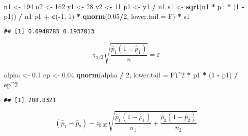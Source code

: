 \documentclass[
]{book}
\newenvironment{Shaded}{\begin{snugshade}}{\end{snugshade}}
\newcommand{\DataTypeTok}[1]{\textcolor[rgb]{0.13,0.29,0.53}{#1}}
\newcommand{\DecValTok}[1]{\textcolor[rgb]{0.00,0.00,0.81}{#1}}
\newcommand{\FloatTok}[1]{\textcolor[rgb]{0.00,0.00,0.81}{#1}}
\newcommand{\KeywordTok}[1]{\textcolor[rgb]{0.13,0.29,0.53}{\textbf{#1}}}
\newcommand{\NormalTok}[1]{#1}
\newcommand{\OperatorTok}[1]{\textcolor[rgb]{0.81,0.36,0.00}{\textbf{#1}}}
\newcommand{\StringTok}[1]{\textcolor[rgb]{0.31,0.60,0.02}{#1}}
\theoremstyle{definition}
\theoremstyle{definition}
\theoremstyle{definition}
\theoremstyle{remark}
\begin{document}
\begin{Shaded}
\begin{Highlighting}[]
\NormalTok{n1 <-}\StringTok{ }\DecValTok{194}
\NormalTok{n2 <-}\StringTok{ }\DecValTok{162}
\NormalTok{y1 <-}\StringTok{ }\DecValTok{28} 
\NormalTok{y2 <-}\StringTok{ }\DecValTok{11}
\NormalTok{p1 <-}\StringTok{ }\NormalTok{y1 }\OperatorTok{/}\StringTok{ }\NormalTok{n1}
\NormalTok{s1 <-}\StringTok{ }\KeywordTok{sqrt}\NormalTok{(n1 }\OperatorTok{*}\StringTok{ }\NormalTok{p1 }\OperatorTok{*}\StringTok{ }\NormalTok{(}\DecValTok{1} \OperatorTok{-}\StringTok{ }\NormalTok{p1)) }\OperatorTok{/}\StringTok{ }\NormalTok{n1}
\NormalTok{p1 }\OperatorTok{+}\StringTok{ }\KeywordTok{c}\NormalTok{(}\OperatorTok{-}\DecValTok{1}\NormalTok{, }\DecValTok{1}\NormalTok{) }\OperatorTok{*}\StringTok{ }\KeywordTok{qnorm}\NormalTok{(}\FloatTok{0.05}\OperatorTok{/}\DecValTok{2}\NormalTok{, }\DataTypeTok{lower.tail =}\NormalTok{ F) }\OperatorTok{*}\StringTok{ }\NormalTok{s1}
\end{Highlighting}
\end{Shaded}

\begin{verbatim}
## [1] 0.0948785 0.1937813
\end{verbatim}

\[
z_{\alpha / 2} \sqrt{\frac{\hat{p}_{1}\left(1-\hat{p}_{1}\right)}{n}} = \varepsilon
\]

\begin{Shaded}
\begin{Highlighting}[]
\NormalTok{alpha <-}\StringTok{ }\FloatTok{0.1}
\NormalTok{ep <-}\StringTok{ }\FloatTok{0.04}
\KeywordTok{qnorm}\NormalTok{(alpha }\OperatorTok{/}\StringTok{ }\DecValTok{2}\NormalTok{, }\DataTypeTok{lower.tail =}\NormalTok{ F)}\OperatorTok{^}\DecValTok{2} \OperatorTok{*}\StringTok{ }\NormalTok{p1 }\OperatorTok{*}\StringTok{ }\NormalTok{(}\DecValTok{1} \OperatorTok{-}\StringTok{ }\NormalTok{p1) }\OperatorTok{/}\StringTok{ }\NormalTok{ep}\OperatorTok{^}\DecValTok{2}
\end{Highlighting}
\end{Shaded}

\begin{verbatim}
## [1] 208.8321
\end{verbatim}

\[
\left(\hat{p}_{1}-\hat{p}_{2}\right)-z_{0.05} \sqrt{\frac{\hat{p}_{1}\left(1-\hat{\rho}_{1}\right)}{n_{1}}+\frac{\hat{\rho}_{2}\left(1-\hat{p}_{2}\right)}{n_{2}}}
\]
\end{document}
